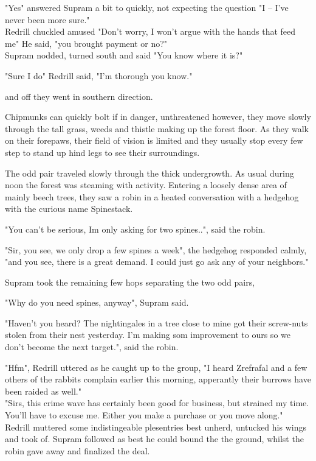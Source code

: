 \documentclass[smalldemyvopaper,11pt,twoside,onecolumn,openright,extrafontsizes]{memoir}
\newlength\drop
\begin{document}
"Yes" answered Supram a bit to quickly, not expecting the question "I -- I've never been more sure."\\

Redrill chuckled amused "Don't worry, I won't argue with the hands that feed me" He said, "you brought payment or no?"\\

Supram nodded, turned south and said "You know where it is?"

"Sure I do" Redrill said, "I'm thorough you know."

and off they went in southern direction.

Chipmunks can quickly bolt if in danger, unthreatened however, they move slowly through the tall grass, weeds and thistle making up the forest floor. As they walk on their forepaws, their field of vision is limited and they usually stop every few step to stand up hind legs to see their surroundings.

The odd pair traveled slowly through the thick undergrowth. As usual during noon the forest was steaming with activity.
Entering a loosely dense area of mainly beech trees, they saw a robin in a heated conversation with a hedgehog with the curious name Spinestack.

"You can't be serious, Im only asking for two spines..", said the robin.

"Sir, you see, we only drop a few spines a week", the hedgehog responded calmly, "and you see, there is a great demand. I could just go ask any of your neighbors."

Supram took the remaining few hops separating the two odd pairs,

"Why do you need spines, anyway", Supram said.

"Haven't you heard? The nightingales in a tree close to mine got their screw-nuts stolen from their nest yesterday. I'm making
som improvement to ours so we don't become the next target.", said the robin.

"Hfm", Redrill uttered as he caught up to the group, "I heard Zrefrafal and a few others of the rabbits complain earlier this morning, apperantly their burrows have been raided as well."\\

"Sirs, this crime wave has certainly been good for business, but strained my time. You'll have to excuse me. Either you make a purchase or you move along."\\

Redrill muttered some indistingeable plesentries best unherd, untucked his wings and took of. Supram followed as best he could bound the the ground, whilst the robin gave away and finalized the deal.\\
\end{document}
